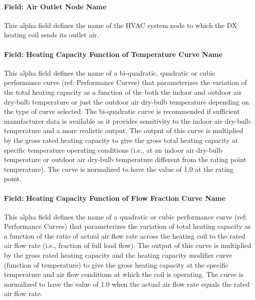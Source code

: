 \paragraph{Field: Air Outlet Node Name}\label{field-air-outlet-node-name-13}

This alpha field defines the name of the HVAC system node to which the DX heating coil sends its outlet air.

\paragraph{Field: Heating Capacity Function of Temperature Curve Name}\label{field-heating-capacity-function-of-temperature-curve-name}

This alpha field defines the name of a bi-quadratic, quadratic or cubic performance curve (ref: Performance Curves) that parameterizes the variation of the total heating capacity as a function of the both the indoor and outdoor air dry-bulb temperature or just the outdoor air dry-bulb temperature depending on the type of curve selected. The bi-quadratic curve is recommended if sufficient manufacturer data is available as it provides sensitivity to the indoor air dry-bulb temperature and a more realistic output. The output of this curve is multiplied by the gross rated heating capacity to give the gross total heating capacity at specific temperature operating conditions (i.e., at an indoor air dry-bulb temperature or outdoor air dry-bulb temperature different from the rating point temperature). The curve is normalized to have the value of 1.0 at the rating point.

\paragraph{Field: Heating Capacity Function of Flow Fraction Curve Name}\label{field-heating-capacity-function-of-flow-fraction-curve-name}

This alpha field defines the name of a quadratic or cubic performance curve (ref: Performance Curves) that parameterizes the variation of total heating capacity as a function of the ratio of actual air flow rate across the heating coil to the rated air flow rate (i.e., fraction of full load flow). The output of this curve is multiplied by the gross rated heating capacity and the heating capacity modifier curve (function of temperature) to give the gross heating capacity at the specific temperature and air flow conditions at which the coil is operating. The curve is normalized to have the value of 1.0 when the actual air flow rate equals the rated air flow rate.

